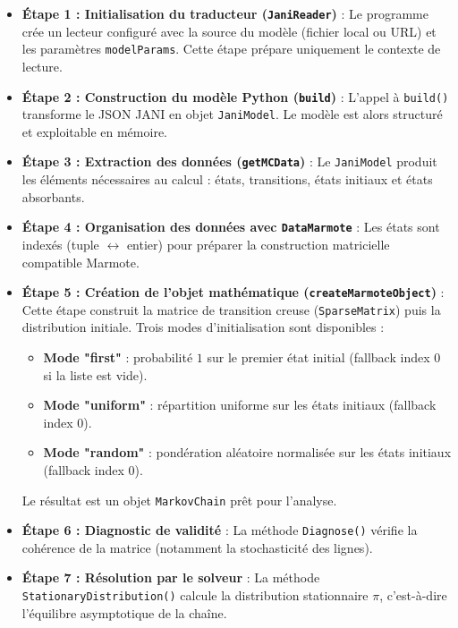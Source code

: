 \documentclass[14pt, a4paper]{extarticle}
\begin{document}
\begin{itemize}
  \item \textbf{Étape 1 : Initialisation du traducteur (\texttt{JaniReader})} : Le programme crée un lecteur configuré avec la source du modèle (fichier local ou URL) et les paramètres \texttt{modelParams}. Cette étape prépare uniquement le contexte de lecture.

  \item \textbf{Étape 2 : Construction du modèle Python (\texttt{build})} : L'appel à \texttt{build()} transforme le JSON JANI en objet \texttt{JaniModel}. Le modèle est alors structuré et exploitable en mémoire.

  \item \textbf{Étape 3 : Extraction des données (\texttt{getMCData})} : Le \texttt{JaniModel} produit les éléments nécessaires au calcul : états, transitions, états initiaux et états absorbants.

  \item \textbf{Étape 4 : Organisation des données avec \texttt{DataMarmote}} : Les états sont indexés (tuple \(\leftrightarrow\) entier) pour préparer la construction matricielle compatible Marmote.

  \item \textbf{Étape 5 : Création de l'objet mathématique (\texttt{createMarmoteObject})} : Cette étape construit la matrice de transition creuse (\texttt{SparseMatrix}) puis la distribution initiale. Trois modes d'initialisation sont disponibles :
  \begin{itemize}
      \item \textbf{Mode "first"} : probabilité \(1\) sur le premier état initial (fallback index \(0\) si la liste est vide).
      \item \textbf{Mode "uniform"} : répartition uniforme sur les états initiaux (fallback index \(0\)).
      \item \textbf{Mode "random"} : pondération aléatoire normalisée sur les états initiaux (fallback index \(0\)).
  \end{itemize}
  Le résultat est un objet \texttt{MarkovChain} prêt pour l'analyse.

  \item \textbf{Étape 6 : Diagnostic de validité} : La méthode \texttt{Diagnose()} vérifie la cohérence de la matrice (notamment la stochasticité des lignes).
  \item \textbf{Étape 7 : Résolution par le solveur} : La méthode \texttt{StationaryDistribution()} calcule la distribution stationnaire \(\pi\), c'est-à-dire l'équilibre asymptotique de la chaîne.
\end{itemize}
\end{document}
